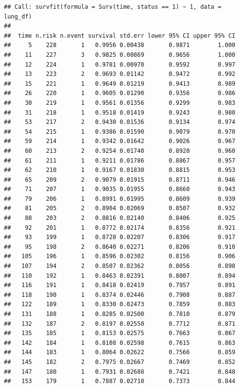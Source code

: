 \documentclass[
]{article}
\begin{document}
\begin{verbatim}
## Call: survfit(formula = Surv(time, status == 1) ~ 1, data = lung_df)
## 
##  time n.risk n.event survival std.err lower 95% CI upper 95% CI
##     5    228       1   0.9956 0.00438       0.9871        1.000
##    11    227       3   0.9825 0.00869       0.9656        1.000
##    12    224       1   0.9781 0.00970       0.9592        0.997
##    13    223       2   0.9693 0.01142       0.9472        0.992
##    15    221       1   0.9649 0.01219       0.9413        0.989
##    26    220       1   0.9605 0.01290       0.9356        0.986
##    30    219       1   0.9561 0.01356       0.9299        0.983
##    31    218       1   0.9518 0.01419       0.9243        0.980
##    53    217       2   0.9430 0.01536       0.9134        0.974
##    54    215       1   0.9386 0.01590       0.9079        0.970
##    59    214       1   0.9342 0.01642       0.9026        0.967
##    60    213       2   0.9254 0.01740       0.8920        0.960
##    61    211       1   0.9211 0.01786       0.8867        0.957
##    62    210       1   0.9167 0.01830       0.8815        0.953
##    65    209       2   0.9079 0.01915       0.8711        0.946
##    71    207       1   0.9035 0.01955       0.8660        0.943
##    79    206       1   0.8991 0.01995       0.8609        0.939
##    81    205       2   0.8904 0.02069       0.8507        0.932
##    88    203       2   0.8816 0.02140       0.8406        0.925
##    92    201       1   0.8772 0.02174       0.8356        0.921
##    93    199       1   0.8728 0.02207       0.8306        0.917
##    95    198       2   0.8640 0.02271       0.8206        0.910
##   105    196       1   0.8596 0.02302       0.8156        0.906
##   107    194       2   0.8507 0.02362       0.8056        0.898
##   110    192       1   0.8463 0.02391       0.8007        0.894
##   116    191       1   0.8418 0.02419       0.7957        0.891
##   118    190       1   0.8374 0.02446       0.7908        0.887
##   122    189       1   0.8330 0.02473       0.7859        0.883
##   131    188       1   0.8285 0.02500       0.7810        0.879
##   132    187       2   0.8197 0.02550       0.7712        0.871
##   135    185       1   0.8153 0.02575       0.7663        0.867
##   142    184       1   0.8108 0.02598       0.7615        0.863
##   144    183       1   0.8064 0.02622       0.7566        0.859
##   145    182       2   0.7975 0.02667       0.7469        0.852
##   147    180       1   0.7931 0.02688       0.7421        0.848
##   153    179       1   0.7887 0.02710       0.7373        0.844

\end{verbatim}
\end{document}
